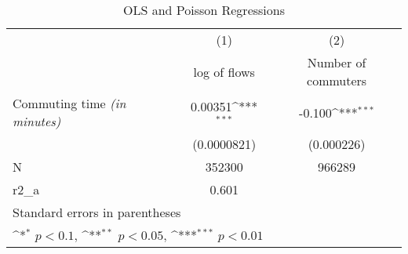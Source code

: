 \begin{table}[htbp]\centering
\def\sym#1{\ifmmode^{#1}\else\(^{#1}\)\fi}
\caption{OLS and Poisson Regressions \label{Q21Tab1}}
\begin{tabular}{l*{2}{c}}
\toprule
                    &\multicolumn{1}{c}{(1)}&\multicolumn{1}{c}{(2)}\\
                    &\multicolumn{1}{c}{log of flows}&\multicolumn{1}{c}{Number of commuters}\\
\midrule
Commuting time \textit{(in minutes)}&     0.00351\sym{***}&      -0.100\sym{***}\\
                    & (0.0000821)         &  (0.000226)         \\
\midrule
N                   &      352300         &      966289         \\
r2\_a                &       0.601         &                     \\
\bottomrule
\multicolumn{3}{l}{\footnotesize Standard errors in parentheses}\\
\multicolumn{3}{l}{\footnotesize \sym{*} \(p<0.1\), \sym{**} \(p<0.05\), \sym{***} \(p<0.01\)}\\
\end{tabular}
\end{table}
